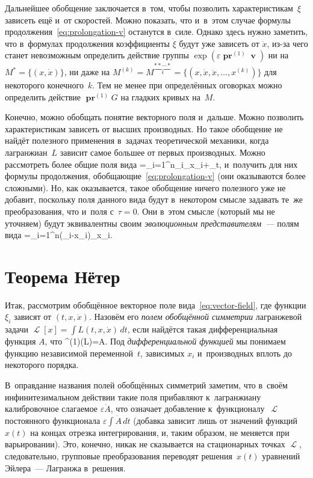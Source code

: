 \documentclass[a4paper,11pt]{article}
\def\[#1\]{\begin{align*}#1\end{align*}}
\newcommand\eqtag[1]{\refstepcounter{equation}\tag{\theequation}\label{#1}}
\theoremstyle{definition}
\begin{document}
Дальнейшее обобщение заключается в~том, чтобы позволить характеристикам~$\xi$
зависеть ещё и~от скоростей. Можно показать, что и~в~этом случае формулы
продолжения~\eqref{eq:prolongation-v} останутся в~силе. Однако здесь нужно
заметить, что в~формулах продолжения коэффициенты $\dot\xi$ будут уже зависеть
от $\ddot x$, из-за чего станет невозможным определить действие группы
$\exp(\varepsilon\operatorname{\symbf{pr}}^{(1)}\mbfv)$ ни на $M^*=\{(x,\dot
x)\}$, ни даже на $M^{(k)}=M^{\underbrace{**\cdots*}_k}=\{(x,\dot x,\ddot
x,\ldots,x^{(k)})\}$ для некоторого конечного~$k$. Тем не менее при
определённых оговорках можно определить действие
$\operatorname{\symbf{pr}}^{(1)}G$ на гладких кривых на~$M$.

Конечно, можно обобщать понятие векторного поля и~дальше. Можно позволить
характеристикам зависеть от высших производных. Но такое обобщение не найдёт
полезного применения в~задачах теоретической механики, когда лагранжиан~$L$
зависит самое большее от первых производных. Можно рассмотреть более общие поля
вида
	\[
	\mbfv=\sum_{i=1}^n\xi_i\partial_{x_i}+\tau\partial_t,
	\]
и~получить для них формулы продолжения, обобщающие~\eqref{eq:prolongation-v}
(они оказываются более сложными). Но, как оказывается, такое обобщение ничего
полезного уже не добавит, поскольку поля данного вида будут в~некотором смысле
задавать те~же преобразования, что и~поля с~$\tau=0$. Они в~этом смысле
(который мы не уточняем) будут эквивалентны своим \emph{эволюционным
представителям~—\/} полям вида
	\[
	\tilde\mbfv=\sum_{i=1}^n(\xi_i-\tau\dot x_i)\partial_{x_i}.
	\]

\section{Теорема Нётер}

Итак, рассмотрим обобщённое векторное поле вида~\eqref{eq:vector-field}, где
функции $\xi_i$ зависят от $(t,x,\dot x)$. Назовём его \emph{полем обобщённой
симметрии\/} лагранжевой задачи $\mscrL[x]=\int L(t,x,\dot x)\,dt$, если
найдётся такая дифференциальная функция $A$, что
	\[
	\operatorname{\symbf{pr}}^{(1)}\mbfv(L)=\dot A.
	\eqtag{eq:symmetry-cond}
	\]
Под \emph{дифференциальной функцией\/} мы понимаем функцию независимой
переменной~$t$, зависимых $x_i$ и~производных вплоть до некоторого порядка.

В~оправдание названия полей обобщённых симметрий заметим, что в~своём
инфинитезимальном действии такие поля прибавляют к~лагранжиану калибровочное
слагаемое $\varepsilon\dot A$, что означает добавление к~функционалу~$\mscrL$
постоянного функционала $\varepsilon\int\dot A\,dt$ (добавка зависит лишь от
значений функций $x(t)$ на концах отрезка интегрирования, и, таким образом, не
меняется при варьировании). Это, конечно, никак не сказывается на стационарных
точках $\mscrL$, следовательно, групповые преобразования переводят
решения~$x(t)$ уравнений Эйлера~— Лагранжа в~решения.
\end{document}
